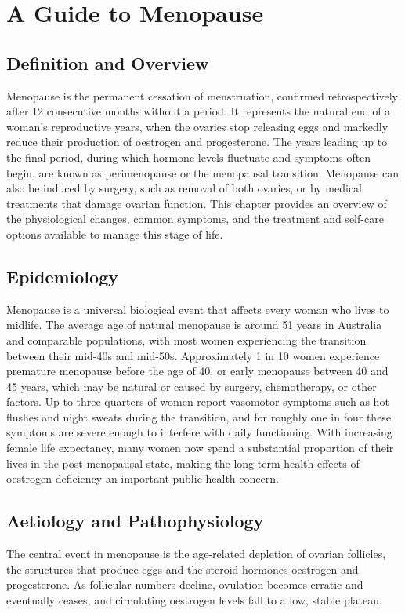 \chapter{A Guide to Menopause}

\section*{Definition and Overview}
Menopause is the permanent cessation of menstruation, confirmed retrospectively after 12 consecutive months without a period. It represents the natural end of a woman's reproductive years, when the ovaries stop releasing eggs and markedly reduce their production of oestrogen and progesterone. The years leading up to the final period, during which hormone levels fluctuate and symptoms often begin, are known as perimenopause or the menopausal transition. Menopause can also be induced by surgery, such as removal of both ovaries, or by medical treatments that damage ovarian function. This chapter provides an overview of the physiological changes, common symptoms, and the treatment and self-care options available to manage this stage of life.

\section*{Epidemiology}
Menopause is a universal biological event that affects every woman who lives to midlife. The average age of natural menopause is around 51 years in Australia and comparable populations, with most women experiencing the transition between their mid-40s and mid-50s. Approximately 1 in 10 women experience premature menopause before the age of 40, or early menopause between 40 and 45 years, which may be natural or caused by surgery, chemotherapy, or other factors. Up to three-quarters of women report vasomotor symptoms such as hot flushes and night sweats during the transition, and for roughly one in four these symptoms are severe enough to interfere with daily functioning. With increasing female life expectancy, many women now spend a substantial proportion of their lives in the post-menopausal state, making the long-term health effects of oestrogen deficiency an important public health concern.

\section*{Aetiology and Pathophysiology}
The central event in menopause is the age-related depletion of ovarian follicles, the structures that produce eggs and the steroid hormones oestrogen and progesterone. As follicular numbers decline, ovulation becomes erratic and eventually ceases, and circulating oestrogen levels fall to a low, stable plateau.

